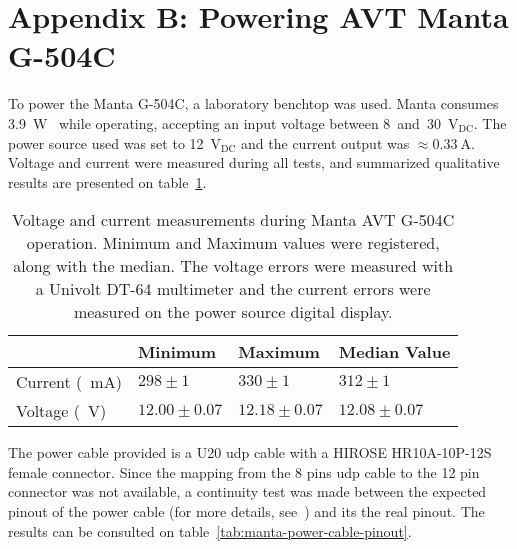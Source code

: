 \section{Appendix B: Powering AVT Manta G-504C}
\label{sec:appendix-b}

To power the Manta G-504C, a laboratory benchtop was used. Manta consumes \SI{3.9 }{\watt}~\cite{MantaG504C} while operating, accepting an input voltage between \SI{8} and \SI{30}{\volt}$_\text{DC}$. The power source used was set to \SI{12}{\volt}$_\text{DC}$ and the current output was $\approx \SI{0.33}{\ampere}$. Voltage and current were measured during all tests, and summarized qualitative results are presented on table~\ref{tab:manta-power}. 
	
\begin{table}[!ht]
	\centering
	\renewcommand{\arraystretch}{1.2}
	\renewcommand{\tabcolsep}{0.45cm}
	\begin{tabular}{@{}llll@{}}
		\toprule
					  & Minimum & Maximum & Median Value \\ \midrule
	Current (\SI{}{\milli\ampere}) & $298 \pm 1$ & $330\pm 1$ & $312 \pm 1$ \\
		Voltage (\SI{}{\volt})  & $12.00\pm 0.07 $ & $12.18\pm 0.07$ & $12.08\pm0.07$ \\
		\bottomrule
	\end{tabular}
	\centering
	\caption[Electrical Operation conditions for Manta AVT G-504C.]{Voltage and current measurements during Manta AVT G-504C operation. Minimum and Maximum values were registered, along with the median. The voltage errors were measured with a Univolt DT-64 multimeter and the current errors were measured on the power source digital display.}
	\label{tab:manta-power}
\end{table}

The power cable provided is a U20 \ac{udp} cable with a HIROSE HR10A-10P-12S female connector. Since the mapping from the 8 pins \ac{udp} cable to the 12 pin connector was not available, a continuity test was made between the expected pinout of the power cable (for more details, see~\cite{AVTCables}) and its the real pinout. The results can be consulted on table~\ref{tab:manta-power-cable-pinout}.

